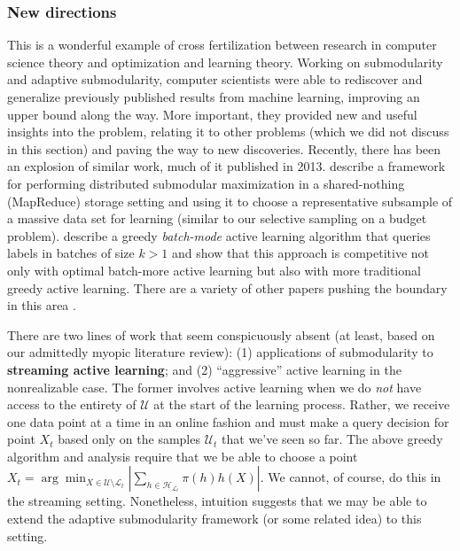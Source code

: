 \subsubsection{New directions}

\noindent This is a wonderful example of cross fertilization between research in computer science theory and optimization and learning theory. Working on submodularity and adaptive submodularity, computer scientists were able to rediscover and generalize previously published results from machine learning, improving an upper bound along the way. More important, they provided new and useful insights into the problem, relating it to other problems (which we did not discuss in this section) and paving the way to new discoveries. Recently, there has been an explosion of similar work, much of it published in 2013. \cite{mirzasoleiman13distributed} describe a framework for performing distributed submodular maximization in a shared-nothing (MapReduce) storage setting and using it to choose a representative subsample of a massive data set for learning (similar to our selective sampling on a budget problem). \cite{chen13near} describe a greedy \textit{batch-mode} active learning algorithm that queries labels in batches of size $k > 1$ and show that this approach is competitive not only with optimal batch-more active learning but also with more traditional greedy active learning. There are a variety of other papers pushing the boundary in this area \cite{GolovinK11} \cite{golovin10near} \cite{zuluaga13active} \cite{hollinger:2011}.

There are two lines of work that seem conspicuously absent (at least, based on our admittedly myopic literature review): (1) applications of submodularity to \textbf{streaming active learning}; and (2) ``aggressive'' active learning in the nonrealizable case. The former involves active learning when we do \textit{not} have access to the entirety of $\mathcal{U}$ at the start of the learning process. Rather, we receive one data point at a time in an online fashion and must make a query decision for point $X_t$ based only on the samples $\mathcal{U}_t$ that we've seen so far. The above greedy algorithm and analysis require that we be able to choose a point $X_t = \arg\min_{X \in \mathcal{U} \setminus \mathcal{L}_t} \left| \sum_{h \in \mathcal{H}_{\mathcal{L}_t}} \pi(h) h(X) \right|$. We cannot, of course, do this in the streaming setting. Nonetheless, intuition suggests that we may be able to extend the adaptive submodularity framework (or some related idea) to this setting.

